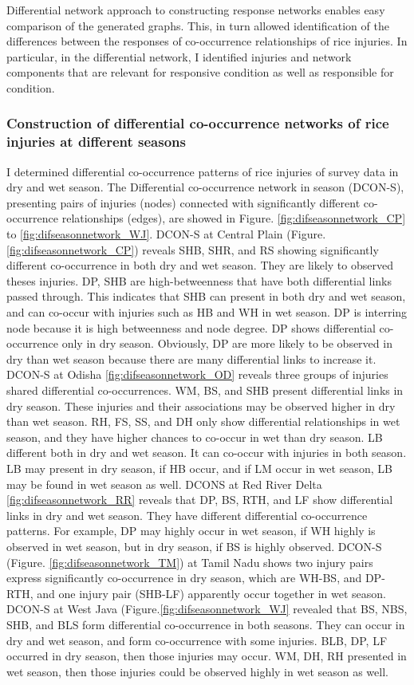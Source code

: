 Differential network approach to constructing response networks enables easy comparison of the generated graphs. This, in turn allowed identification of the differences between the responses of co-occurrence relationships of rice injuries. In particular, in the differential network, I identified injuries and network components that are relevant for responsive condition as well as responsible for condition. 


\subsubsection{Construction of differential co-occurrence networks of rice injuries at different seasons}

I determined differential co-occurrence patterns of rice injuries of survey data in dry and wet season. The Differential co-occurrence network in season (DCON-S), presenting pairs of injuries (nodes) connected with significantly different co-occurrence relationships (edges), are showed in Figure. \ref{fig:difseasonnetwork_CP} to \ref{fig:difseasonnetwork_WJ}. DCON-S at Central Plain (Figure. \ref{fig:difseasonnetwork_CP}) reveals SHB, SHR, and RS showing significantly different co-occurrence in both dry and wet season. They are likely to observed theses injuries. DP, SHB are high-betweenness that have both differential links passed through. This indicates that SHB can present in both dry and wet season, and can co-occur with injuries such as HB and WH in wet season. DP is interring node because it is high betweenness and node degree. DP shows differential co-occurrence only in dry season. Obviously, DP are more likely to be observed in dry than wet season because there are many differential links to increase it. DCON-S at Odisha \ref{fig:difseasonnetwork_OD} reveals three groups of injuries shared differential co-occurrences.  WM, BS, and SHB present differential links in dry season. These injuries and their associations may be observed higher in dry than wet season. RH, FS, SS, and DH only show differential relationships in wet season, and they have higher chances to co-occur in wet than dry season. LB different both in dry and wet season. It can co-occur with injuries in both season. LB may present in dry season, if HB occur, and if LM occur in wet season, LB may be found in wet season as well.
DCONS at Red River Delta \ref{fig:difseasonnetwork_RR} reveals that DP, BS, RTH, and LF show differential links in dry and wet season. They have different differential co-occurrence patterns. For example, DP may highly occur in wet season, if WH highly is observed in wet season, but in dry season, if BS is highly observed. DCON-S (Figure. \ref{fig:difseasonnetwork_TM}) at Tamil Nadu shows two injury pairs express significantly co-occurrence in dry season, which are WH-BS, and DP-RTH, and one injury pair (SHB-LF) apparently occur together in wet season. DCON-S at West Java (Figure.\ref{fig:difseasonnetwork_WJ} revealed that BS, NBS, SHB, and BLS form differential co-occurrence in both seasons. They can occur in dry and wet season, and form co-occurrence with some injuries. BLB, DP, LF occurred in dry season, then those injuries may occur. WM, DH, RH presented in wet season, then those injuries could be observed highly in wet season as well.

